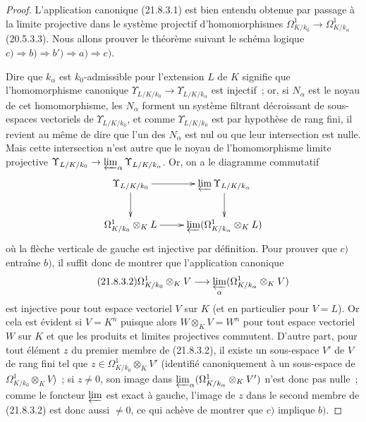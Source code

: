 \begin{proof}
L'application canonique (21.8.3.1) est bien entendu obtenue par passage à la
limite projective dans le système projectif d'homomorphismes
$\Omega^1_{K/k_0}\to\Omega^1_{K/k_\alpha}$ (20.5.3.3). Nous allons prouver
le théorème suivant le schéma logique $c)\Rightarrow b)\Rightarrow b')
\Rightarrow a)\Rightarrow c)$.

Dire que $k_\alpha$ est $k_0$-admissible pour l'extension $L$ de $K$ signifie
que l'homomorphisme
canonique $\Upsilon_{L/K/k_0}\to\Upsilon_{L/K/k_\alpha}$ est injectif~; or,
si $N_\alpha$ est le noyau de cet homomorphisme, les $N_\alpha$ forment un
système filtrant décroissant de sous-espaces vectoriels de
$\Upsilon_{L/K/k_0}$, et comme $\Upsilon_{L/K/k_0}$ est par hypothèse de rang
fini, il revient au même de dire que l'un des $N_\alpha$ est nul ou que leur
intersection est nulle. Mais cette intersection n'est autre que le noyau de
l'homomorphisme limite projective
$\Upsilon_{L/K/k_0}\to\varprojlim_\alpha\Upsilon_{L/K/k_\alpha}$. Or, on a
le diagramme commutatif
\[
\xymatrix{
\Upsilon_{L/K/k_0}\ar[r]\ar[d]&\varprojlim\Upsilon_{L/K/k_\alpha}\ar[d]\\
\Omega^1_{K/k_0}\otimes_KL\ar[r]&
\varprojlim(\Omega^1_{K/k_\alpha}\otimes_KL)
}
\]
où la flèche verticale de gauche est injective par définition. Pour prouver
que $c)$ entraîne $b)$, il suffit donc de montrer que l'application canonique
\begin{equation}
\tag{21.8.3.2}
\label{0.21.8.3.2-fr}
\Omega^1_{K/k_0}\otimes_KV\longrightarrow
\varprojlim_{\alpha}(\Omega^1_{K/k_\alpha}\otimes_KV)
\end{equation}
est injective pour tout espace vectoriel $V$ sur $K$ (et en particulier pour
$V=L$). Or cela est évident si $V=K^n$ puisque alors
$W\otimes_KV=W^n$ pour tout espace vectoriel $W$ sur $K$ et que les produits
et limites projectives commutent. D'autre part, pour tout élément $z$ du
premier membre de (21.8.3.2), il existe un sous-espace $V'$ de $V$ de rang
fini tel que $z\in\Omega^1_{K/k_0}\otimes_KV'$ (identifié canoniquement à un
sous-espace de $\Omega^1_{K/k_0}\otimes_KV$)~; si $z\ne0$, son image dans
$\varprojlim_\alpha(\Omega^1_{K/k_\alpha}\otimes_KV')$ n'est donc pas nulle~;
comme le foncteur $\varprojlim$ est exact à gauche, l'image de $z$ dans le
second membre de (21.8.3.2) est donc aussi $\ne0$, ce qui achève de montrer
que $c)$ implique $b)$.


\end{proof}
